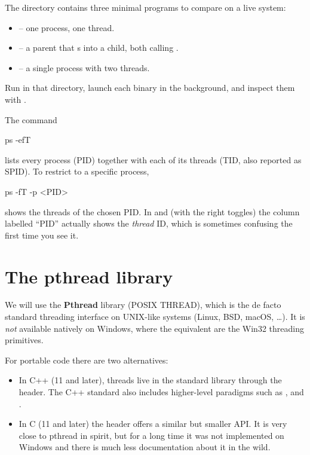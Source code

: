 \begin{exampleblock}
The  directory contains three minimal programs to compare on a live system:
\begin{itemize}[noitemsep]
    \item {} -- one process, one thread.
    \item {} -- a parent that s into a child, both calling .
    \item {} -- a single process with two threads.
\end{itemize}
Run  in that directory, launch each binary in the background, and inspect them with .
\end{exampleblock}

\begin{tipsblock}
The command
\begin{codeblock}[language=bash, numbers=none]
ps -efT
\end{codeblock}
lists every process (PID) together with each of its threads (TID, also reported as SPID). To restrict to a specific process,
\begin{codeblock}[language=bash, numbers=none]
ps -fT -p <PID>
\end{codeblock}
shows the threads of the chosen PID. In  and  (with the right toggles) the column labelled ``PID'' actually shows the \emph{thread} ID, which is sometimes confusing the first time you see it.
\end{tipsblock}

\section{The pthread library}

We will use the \textbf{Pthread} library (POSIX THREAD), which is the de facto standard threading interface on UNIX-like systems (Linux, BSD, macOS, \dots). It is \emph{not} available natively on Windows, where the equivalent are the Win32 threading primitives.

For portable code there are two alternatives:
\begin{itemize}[noitemsep]
    \item In C++ (11 and later), threads live in the standard library through the  header. The C++ standard also includes higher-level paradigms such as ,  and .
    \item In C (11 and later) the  header offers a similar but smaller API. It is very close to pthread in spirit, but for a long time it was not implemented on Windows and there is much less documentation about it in the wild.
\end{itemize}

